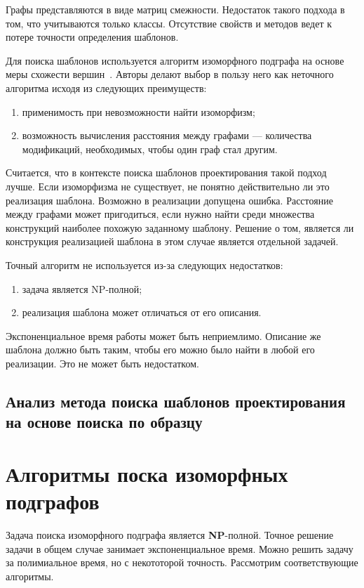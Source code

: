 Графы представляются в виде матриц смежности.
Недостаток такого подхода в том, что учитываются только классы.
Отсутствие свойств и методов ведет к потере точности определения шаблонов.

Для поиска шаблонов используется алгоритм изоморфного подграфа на основе меры
схожести вершин~\cite{SimilarityGraphVertices}.
Авторы делают выбор в пользу него как неточного алгоритма исходя из следующих
преимуществ:
\begin{enumerate}
\item применимость при невозможности найти изоморфизм;
\item возможность вычисления расстояния между графами --- количества модификаций,
необходимых, чтобы один граф стал другим.
\end{enumerate}

Считается, что в контексте поиска шаблонов проектирования такой подход лучше.
Если изоморфизма не существует, не понятно действительно ли это реализация шаблона.
Возможно в реализации допущена ошибка.
Расстояние между графами может пригодиться, если нужно найти среди множества
конструкций наиболее похожую заданному шаблону.
Решение о том, является ли конструкция реализацией шаблона в этом случае является
отдельной задачей.

Точный алгоритм не используется из-за следующих недостатков:
\begin{enumerate}
\item задача является NP-полной;
\item реализация шаблона может отличаться от его описания.
\end{enumerate}

Экспоненциальное время работы может быть неприемлимо.
Описание же шаблона должно быть таким, чтобы его можно было найти в любой его
реализации. Это не может быть недостатком.

\subsection{Анализ метода поиска шаблонов проектирования на основе поиска по образцу}

\cite{DesignPatternTemplateMatching}

\section{Алгоритмы поска изоморфных подграфов}

Задача поиска изоморфного подграфа является \textbf{NP}-полной.
Точное решение задачи в общем случае занимает экспоненциальное время.
Можно решить задачу за полимиальное время, но с некототорой точность.
Рассмотрим соответствующие алгоритмы.

